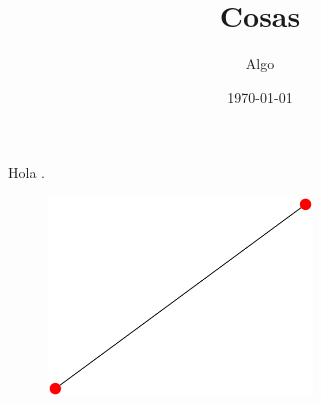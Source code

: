 \documentclass{article}
\author{Algo}
\title{Cosas} %
\date{\today}
\begin{document}
\maketitle

Hola \citep{demo}.

\begin{figure}
\centering
\includegraphics[width=70mm]{prueba.eps}
\end{figure}



\end{document}
